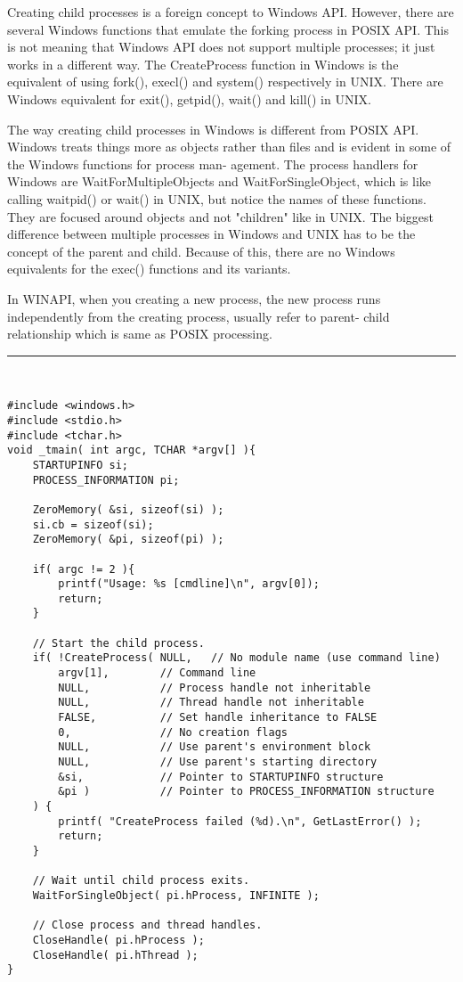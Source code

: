 \documentclass[10pt,draftclsnofoot,onecolumn,journal,compsoc]{IEEEtran}
\begin{document}
Creating child processes is a foreign concept to Windows API. However, there are several Windows functions that emulate the forking process in POSIX API. This is not meaning that Windows API does not support multiple processes; it just works in a different way. The CreateProcess function in Windows is the equivalent of using fork(), execl() and system() respectively in UNIX. There are Windows equivalent for exit(), getpid(), wait() and kill() in UNIX.\par
The way creating child processes in Windows is different from POSIX API. Windows treats things more as objects rather than files and is evident in some of the Windows functions for process man- agement. The process handlers for Windows are WaitForMultipleObjects and WaitForSingleObject, which is like calling waitpid() or wait() in UNIX, but notice the names of these functions. They are focused around objects and not "children" like in UNIX. The biggest difference between multiple processes in Windows and UNIX has to be the concept of the parent and child. Because of this, there are no Windows equivalents for the exec() functions and its variants. \par
In WINAPI, when you creating a new process, the new process runs independently from the creating process, usually refer to parent- child relationship which is same as POSIX processing.\par
\noindent\rule{15.5cm}{0.4pt}\\
\begin{verbatim}
#include <windows.h>
#include <stdio.h>
#include <tchar.h>
void _tmain( int argc, TCHAR *argv[] ){
    STARTUPINFO si;
    PROCESS_INFORMATION pi;

    ZeroMemory( &si, sizeof(si) );
    si.cb = sizeof(si);
    ZeroMemory( &pi, sizeof(pi) );

    if( argc != 2 ){
        printf("Usage: %s [cmdline]\n", argv[0]);
        return;
    }

    // Start the child process. 
    if( !CreateProcess( NULL,   // No module name (use command line)
        argv[1],        // Command line
        NULL,           // Process handle not inheritable
        NULL,           // Thread handle not inheritable
        FALSE,          // Set handle inheritance to FALSE
        0,              // No creation flags
        NULL,           // Use parent's environment block
        NULL,           // Use parent's starting directory 
        &si,            // Pointer to STARTUPINFO structure
        &pi )           // Pointer to PROCESS_INFORMATION structure
    ) {
        printf( "CreateProcess failed (%d).\n", GetLastError() );
        return;
    }

    // Wait until child process exits.
    WaitForSingleObject( pi.hProcess, INFINITE );

    // Close process and thread handles. 
    CloseHandle( pi.hProcess );
    CloseHandle( pi.hThread );
}
\end{verbatim}
\end{document}
